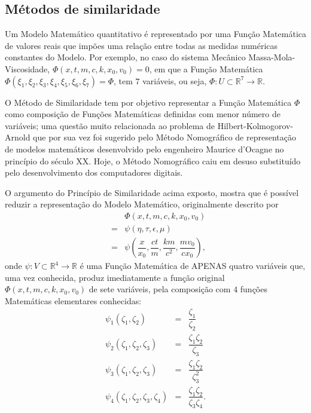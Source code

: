 \subsection{Métodos de similaridade}

    Um Modelo Matemático quantitativo é representado por uma Função Matemática de valores reais que impões uma relação entre todas as medidas numéricas constantes do Modelo. Por exemplo, no caso do sistema Mecânico Massa-Mola-Viscosidade, \(\Phi(x, t, m, c, k, x_0, v_0) = 0\), em que a Função Matemática \(\Phi(\xi_{1}, \xi_{2}, \xi_{3}, \xi_{4}, \xi_{5}, \xi_{6}, \xi_{7}) = \Phi\), tem \(7\) variáveis, ou seja, \(\Phi: U \subset \mathbb{R}^{7} \to \mathbb{R}\).

    O Método de Similaridade tem por objetivo representar a Função Matemática \(\Phi\) como composição de Funções Matemáticas definidas com menor número de variáveis; uma questão muito relacionada ao problema de Hilbert-Kolmogorov-Arnold que por sua vez foi sugerido pelo Método Nomográfico de representação de modelos matemáticos desenvolvido pelo engenheiro Maurice d’Ocagne no princípio do século XX. Hoje, o Método Nomográfico caiu em desuso substituído pelo desenvolvimento dos computadores digitais.

    O argumento do Princípio de Similaridade acima exposto, mostra que é possível reduzir a representação do Modelo Matemático, originalmente descrito por
    \[\begin{array}{rcl}
    & & \Phi(x, t, m, c, k, x_0, v_0) \\
    &=& \psi(\eta, \tau, \epsilon, \mu) \\
    &=& \psi\left(\dfrac{x}{x_0}, \dfrac{ct}{m}, \dfrac{km}{c^2}, \dfrac{mv_0}{cx_0}\right),
    \end{array}\]
    onde {\red \(\psi: V \subset \mathbb{R}^4 \to \mathbb{R}\)} é uma Função Matemática de APENAS quatro variáveis que, uma vez conhecida, produz imediatamente a função original \(\Phi(x, t, m, c, k, x_0, v_0)\) de sete variáveis, pela composição com \(4\) funções Matemáticas elementares conhecidas:
    \[\begin{array}{rcl}
    \psi_{1}(\zeta_{1}, \zeta_{2})
    &=& \dfrac{\zeta_{1}}{\zeta_{2}} \\[0.3cm]
    \psi_{2}(\zeta_{1}, \zeta_{2}, \zeta_{3})
    &=& \dfrac{\zeta_{1}\zeta_{2}}{\zeta_{3}} \\[0.3cm]
    \psi_{3}(\zeta_{1}, \zeta_{2}, \zeta_{3})
    &=& \dfrac{\zeta_{1}\zeta_{2}}{\zeta_{3}^{2}} \\[0.3cm]
    \psi_{4}(\zeta_{1}, \zeta_{2}, \zeta_{3}, \zeta_{4})
    &=& \dfrac{\zeta_{1}\zeta_{2}}{\zeta_{3}\zeta_{4}}.
    \end{array}\]

